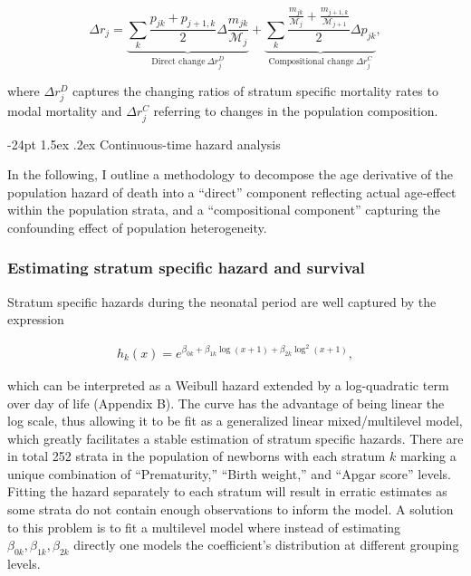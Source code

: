\documentclass[10pt,twoside,reqno]{article}
\makeatletter
\renewcommand\subsection{\@startsection{subsection}{2}{\z@}%
                                     {-24pt}%
                                     {1.5ex \@plus .2ex}%
                                     {\normalfont\normalsize\bfseries}}
\makeatother
\begin{document}
\begin{equation}
\Delta r_j =
  \underbrace{
    \sum_k \frac {p_{jk}+p_{j+1,k}} {2}
    \Delta \frac{m_{jk}}{\mathscr{M}_j}
  }_{
    \text{Direct change}~\Delta r_j^D
  } +
  \underbrace{
    \sum_k \frac {
      \frac{m_{jk}}{\mathscr{M}_j} + \frac{m_{j+1,k}}{\mathscr{M}_{j+1}}
    } {2}
    \Delta p_{jk}
  }_{
    \text{Compositional change}~\Delta r_j^C
  },
\label{eq:decomp-memora}
\end{equation}

where \(\Delta r_j^D\) captures the changing ratios of stratum specific mortality rates to modal mortality and \(\Delta r_j^C\) referring to changes in the population composition.

\subsection{Continuous-time hazard analysis}\label{continuous-time-hazard-analysis}

In the following, I outline a methodology to decompose the age derivative of the population hazard of death into a ``direct'' component reflecting actual age-effect within the population strata, and a ``compositional component'' capturing the confounding effect of population heterogeneity.

\subsubsection*{Estimating stratum specific hazard and survival}\label{estimating-stratum-specific-hazard-and-survival}

Stratum specific hazards during the neonatal period are well captured by the expression

\begin{equation}
  \begin{aligned}
    h_k(x) = e^{\beta_{0k} + \beta_{1k}\log(x+1) +
    \beta_{2k}\log^2(x+1)},
  \end{aligned}
\label{eq:lqhzrd}
\end{equation}

which can be interpreted as a Weibull hazard extended by a log-quadratic term over day of life (Appendix B). The curve has the advantage of being linear the log scale, thus allowing it to be fit as a generalized linear mixed/multilevel model, which greatly facilitates a stable estimation of stratum specific hazards. There are in total 252 strata in the population of newborns with each stratum \(k\) marking a unique combination of ``Prematurity,'' ``Birth weight,'' and ``Apgar score'' levels. Fitting the hazard separately to each stratum will result in erratic estimates as some strata do not contain enough observations to inform the model. A solution to this problem is to fit a multilevel model where instead of estimating \(\beta_{0k}, \beta_{1k}, \beta_{2k}\) directly one models the coefficient's distribution at different grouping levels.
\end{document}
